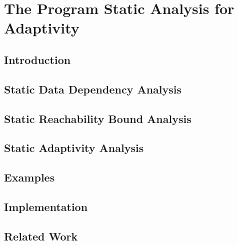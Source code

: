 \chapter{The Program Static Analysis for Adaptivity}
\label{ch:static}


\section{Introduction}
\label{sec:static-intro}

\section{Static Data Dependency Analysis}
\label{sec:static-datadep}

\section{Static Reachability Bound Analysis}
\label{sec:static-reachability}

\section{Static Adaptivity Analysis}
\label{sec:static-adapt}

\section{Examples}
\label{sec:static-examples}
%
\section{Implementation}
\label{sec:static-implementation}

\section{Related Work}
\label{sec:static-relatedwork}
